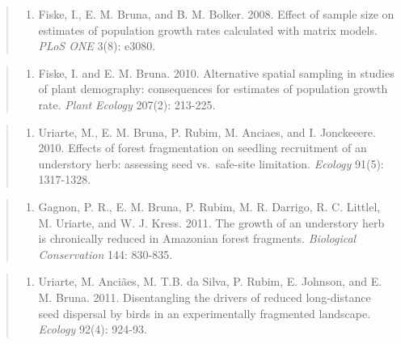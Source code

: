 \documentclass[
  12pt,
  man, donotrepeattitle,floatsintext]{apa6}
\providecommand{\tightlist}{%
  \setlength{\itemsep}{0pt}\setlength{\parskip}{0pt}}
\begin{document}
\begin{quote}
\begin{enumerate}
\def\labelenumi{\arabic{enumi}.}
\setcounter{enumi}{8}
\tightlist
\item
  Fiske, I., E. M. Bruna, and B. M. Bolker. 2008. Effect of sample size on estimates of population growth rates calculated with matrix models. \emph{PLoS ONE} 3(8): e3080.
\end{enumerate}
\end{quote}

\begin{quote}
\begin{enumerate}
\def\labelenumi{\arabic{enumi}.}
\setcounter{enumi}{9}
\tightlist
\item
  Fiske, I. and E. M. Bruna. 2010. Alternative spatial sampling in studies of plant demography: consequences for estimates of population growth rate. \emph{Plant Ecology} 207(2): 213-225.
\end{enumerate}
\end{quote}

\begin{quote}
\begin{enumerate}
\def\labelenumi{\arabic{enumi}.}
\setcounter{enumi}{10}
\tightlist
\item
  Uriarte, M., E. M. Bruna, P. Rubim, M. Anciaes, and I. Jonckeeere. 2010. Effects of forest fragmentation on seedling recruitment of an understory herb: assessing seed vs.~safe-site limitation. \emph{Ecology} 91(5): 1317-1328.
\end{enumerate}
\end{quote}

\begin{quote}
\begin{enumerate}
\def\labelenumi{\arabic{enumi}.}
\setcounter{enumi}{11}
\tightlist
\item
  Gagnon, P. R., E. M. Bruna, P. Rubim, M. R. Darrigo, R. C. Littlel, M. Uriarte, and W. J. Kress. 2011. The growth of an understory herb is chronically reduced in Amazonian forest fragments. \emph{Biological Conservation} 144: 830-835.
\end{enumerate}
\end{quote}

\begin{quote}
\begin{enumerate}
\def\labelenumi{\arabic{enumi}.}
\setcounter{enumi}{12}
\tightlist
\item
  Uriarte, M. Anciães, M. T.B. da Silva, P. Rubim, E. Johnson, and E. M. Bruna. 2011. Disentangling the drivers of reduced long-distance seed dispersal by birds in an experimentally fragmented landscape. \emph{Ecology} 92(4): 924-93.
\end{enumerate}
\end{quote}
\end{document}
